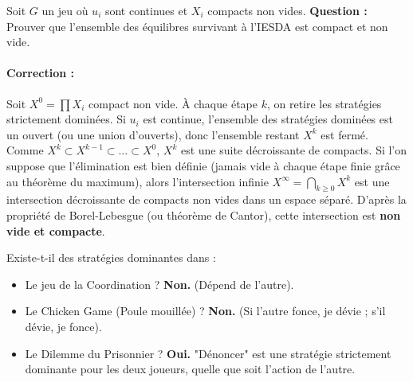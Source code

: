\begin{exemple}
Soit $G$ un jeu où $u_i$ sont continues et $X_i$ compacts non vides.
\textbf{Question :} Prouver que l'ensemble des équilibres survivant à l'IESDA est compact et non vide.

\paragraph{Correction :}
Soit $X^0 = \prod X_i$ compact non vide.
À chaque étape $k$, on retire les stratégies strictement dominées. Si $u_i$ est continue, l'ensemble des stratégies dominées est un ouvert (ou une union d'ouverts), donc l'ensemble restant $X^k$ est fermé.
Comme $X^k \subset X^{k-1} \subset \dots \subset X^0$, $X^k$ est une suite décroissante de compacts.
Si l'on suppose que l'élimination est bien définie (jamais vide à chaque étape finie grâce au théorème du maximum), alors l'intersection infinie $X^\infty = \bigcap_{k \ge 0} X^k$ est une intersection décroissante de compacts non vides dans un espace séparé.
D'après la propriété de Borel-Lebesgue (ou théorème de Cantor), cette intersection est \textbf{non vide et compacte}.
\end{exemple}

\begin{exemple}
Existe-t-il des stratégies dominantes dans :
\begin{itemize}
    \item Le jeu de la Coordination ? \textbf{Non.} (Dépend de l'autre).
    \item Le Chicken Game (Poule mouillée) ? \textbf{Non.} (Si l'autre fonce, je dévie ; s'il dévie, je fonce).
    \item Le Dilemme du Prisonnier ? \textbf{Oui.} "Dénoncer" est une stratégie strictement dominante pour les deux joueurs, quelle que soit l'action de l'autre.
\end{itemize}
\end{exemple}
